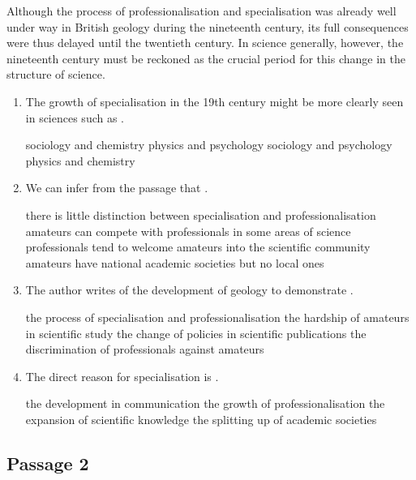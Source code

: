Although the process of professionalisation and specialisation was
already well under way in British geology during the nineteenth century,
its full consequences were thus delayed until the twentieth century. In
science generally, however, the nineteenth century must be reckoned as
the crucial period for this change in the structure of science.


\begin{enumerate}[resume]
	\item
The growth of specialisation in the 19th century might be more
clearly seen in sciences such as \lineread.

\fourchoices
{sociology and chemistry}
{physics and psychology}
{sociology and psychology}
{physics and chemistry}



\item
We can infer from the passage that \lineread.


\fourchoices
{there is little distinction between specialisation and professionalisation}
{amateurs can compete with professionals in some areas of science}
{professionals tend to welcome amateurs into the scientific community}
{amateurs have national academic societies but no local ones}



\item
The author writes of the development of geology to demonstrate \lineread.


\fourchoices
{the process of specialisation and professionalisation}
{the hardship of amateurs in scientific study}
{the change of policies in scientific publications}
{the discrimination of professionals against amateurs}



\item
The direct reason for specialisation is \lineread.


\fourchoices
{the development in communication}
{the growth of professionalisation}
{the expansion of scientific knowledge}
{the splitting up of academic societies}

\end{enumerate}

\newpage

\subsection{Passage 2}

